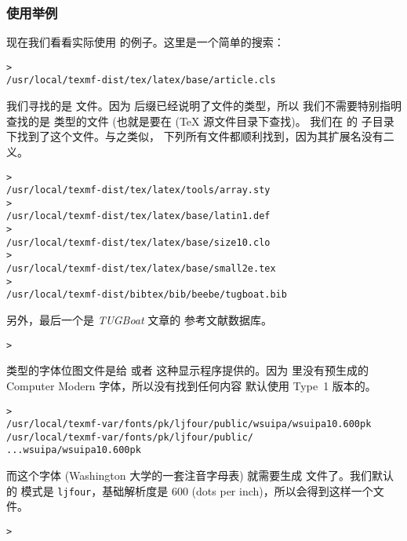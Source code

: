 \documentclass{article}
\begin{document}
\subsubsection{使用举例}
\label{sec:examples-of-use}

现在我们看看实际使用 \KPS{} 的例子。这里是一个简单的搜索：

\begin{alltt}
  > 
  /usr/local/texmf-dist/tex/latex/base/article.cls
\end{alltt}
我们寻找的是  文件。因为  后缀已经说明了文件的类型，所以
我们不需要特别指明查找的是  类型的文件 (也就是要在 (\TeX{} 源文件目录下查找)。
我们在  的  子目录下找到了这个文件。与之类似，
下列所有文件都顺利找到，因为其扩展名没有二义。
\begin{alltt}
  > 
  /usr/local/texmf-dist/tex/latex/tools/array.sty
  > 
  /usr/local/texmf-dist/tex/latex/base/latin1.def
  > 
  /usr/local/texmf-dist/tex/latex/base/size10.clo
  > 
  /usr/local/texmf-dist/tex/latex/base/small2e.tex
  > 
  /usr/local/texmf-dist/bibtex/bib/beebe/tugboat.bib
\end{alltt}

另外，最后一个是 \textsl{TUGBoat} 文章的 \BibTeX{} 参考文献数据库。

\begin{alltt}
  > 
\end{alltt}

 类型的字体位图文件是给  或者 
这种显示程序提供的。因为 \TL{} 里没有预生成的 Computer Modern 
字体，所以没有找到任何内容\Dash \TL{} 默认使用 Type~1 版本的。

\begin{alltt}
  > 
  \ifSingleColumn   /usr/local/texmf-var/fonts/pk/ljfour/public/wsuipa/wsuipa10.600pk
  \else /usr/local/texmf-var/fonts/pk/ljfour/public/
    ...                         wsuipa/wsuipa10.600pk
  \fi\end{alltt}

而这个字体 (Washington 大学的一套注音字母表) 就需要生成  文件了。我们默认的
\MF{} 模式是 \texttt{ljfour}，基础解析度是 600\dpi{} (dots per inch)，所以会得到这样一个文件。
\begin{alltt}
  > 
\end{alltt}
\end{document}
